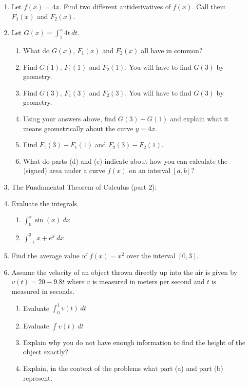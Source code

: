 \documentclass[11pt,fleqn]{article}
\renewcommand{\d}{\displaystyle}
\begin{document}
\begin{enumerate}
\item Let $f(x)=4x.$ Find two different antiderivatives of $f(x)$. Call them $F_1(x)$ and $F_2(x).$
\vfill
\item Let $G(x)= \int_1^x 4t \: dt.$ 
	\begin{enumerate}
	\item What do $G(x)$, $F_1(x)$ and $F_2(x)$ all have in common?
	\vfill
	\item Find $G(1)$, $F_1(1)$ and $F_2(1).$ You will have to find $G(3)$ by geometry.
	\vfill
	\item Find $G(3)$, $F_1(3)$ and $F_2(3).$ You will have to find $G(3)$ by geometry.
	\vfill
	\item Using your answers above, find $G(3)-G(1)$ and explain what it means geometrically about the curve $y=4x.$\\
	\item Find $F_1(3)-F_1(1)$ and $F_2(3)-F_2(1)$.
	\vfill
	\item What do parts (d) and (e) indicate about how you can calculate the (signed) area under a curve $f(x)$ on an interval $[a,b]$?
	\vfill
	\end{enumerate}
\newpage
\item The Fundamental Theorem of Calculus (part 2):
\vfill
\item Evaluate the integrals.
	\begin{multicols}{2}
	\begin{enumerate}
	\item $\d \int_0^{\pi} \sin (x) \: dx$
	\item $\d \int_{-1}^3 x+e^x \: dx$
	\end{enumerate}
	\end{multicols}
\vfill
\item Find the average value of $f(x)=x^2$ over the interval $[0,3].$
\vfill
\item Assume the velocity of an object thrown directly up into the air is given by $v(t)= 20-9.8t$ where $v$ is measured in meters per second and $t$ is measured in seconds. 
	\begin{enumerate}
	\item Evaluate $\int_0^1 v(t) \: dt$
	\vfill
	\item Evaluate $\int v(t) \: dt$
	\vfill
	\item Explain why you do not have enough information to find the height of the object exactly?
	\vfill
	\item Explain, in the context of the problems what part (a) and part (b) represent.
	\vfill
	\end{enumerate}

\end{enumerate}
\end{document}
